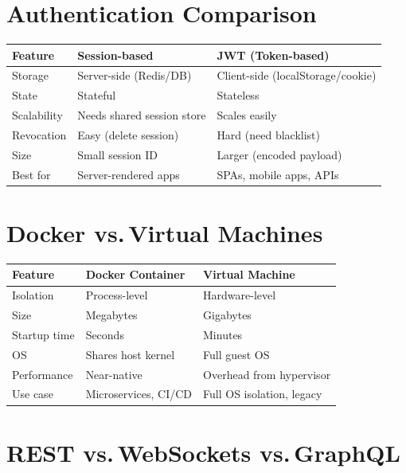 \documentclass[12pt, a4paper, oneside]{book}
\begin{document}
\section{Authentication Comparison}

\begin{center}
\begin{tabular}{l l l}
\toprule
\textbf{Feature} & \textbf{Session-based} & \textbf{JWT (Token-based)} \\
\midrule
Storage & Server-side (Redis/DB) & Client-side (localStorage/cookie) \\
State & Stateful & Stateless \\
Scalability & Needs shared session store & Scales easily \\
Revocation & Easy (delete session) & Hard (need blacklist) \\
Size & Small session ID & Larger (encoded payload) \\
Best for & Server-rendered apps & SPAs, mobile apps, APIs \\
\bottomrule
\end{tabular}
\end{center}

\section{Docker vs.\,Virtual Machines}

\begin{center}
\begin{tabular}{l l l}
\toprule
\textbf{Feature} & \textbf{Docker Container} & \textbf{Virtual Machine} \\
\midrule
Isolation & Process-level & Hardware-level \\
Size & Megabytes & Gigabytes \\
Startup time & Seconds & Minutes \\
OS & Shares host kernel & Full guest OS \\
Performance & Near-native & Overhead from hypervisor \\
Use case & Microservices, CI/CD & Full OS isolation, legacy \\
\bottomrule
\end{tabular}
\end{center}

\section{REST vs.\,WebSockets vs.\,GraphQL}
\end{document}
